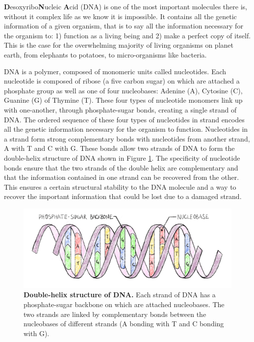 \documentclass[
  11pt,
  twoside,
  BCOR=10mm,
  listof=totoc]{scrbook}
\newcommand{\extcaption}[2]{
    \caption[#1]{
        \textbf{#1}\newline
        #2
    }
}
\begin{document}
\textbf{D}esoxyribo\textbf{N}ucleic \textbf{A}cid (DNA) is one of the most important molecules there is, without it complex life as we know it is impossible. It contains all the genetic information of a given organism, that is to say all the information necessary for the organism to: 1) function as a living being and 2) make a perfect copy of itself. This is the case for the overwhelming majority of living organisms on planet earth, from elephants to potatoes, to micro-organisms like bacteria.

DNA is a polymer, composed of monomeric units called nucleotides. Each nucleotide is composed of ribose (a five carbon sugar) on which are attached a phosphate group as well as one of four nucleobases: Adenine (A), Cytosine (C), Guanine (G) of Thymine (T). These four types of nucleotide monomers link up with one-another, through phosphate-sugar bonds, creating a single strand of DNA. The ordered sequence of these four types of nucleotides in strand encodes all the genetic information necessary for the organism to function. Nucleotides in a strand form strong complementary bonds with nucleotides from another strand, A with T and C with G. These bonds allow two strands of DNA to form the double-helix structure of DNA \autocite{watson1953} shown in Figure \ref{fig:figDNA}. The specificity of nucleotide bonds ensure that the two strands of the double helix are complementary and that the information contained in one strand can be recovered from the other. This ensures a certain structural stability to the DNA molecule and a way to recover the important information that could be lost due to a damaged strand.

\begin{figure}[h]
\centering
\includegraphics[width=\linewidth]{./figures/Sequence-Intro/DNA.png}
\extcaption{Double-helix structure of DNA.}{Each strand of DNA has a phosphate-sugar backbone on which are attached nucleobases. The two strands are linked by complementary bonds between the nucleobases of different strands (A bonding with T and C bonding with G).}
\label{fig:figDNA}
\end{figure}
\end{document}
